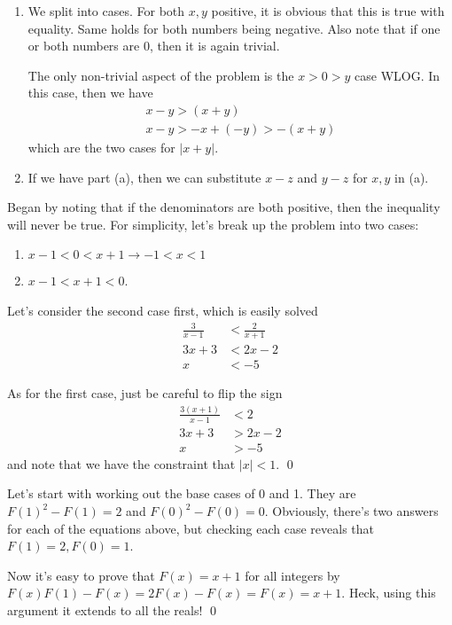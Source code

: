 \setcounter{Exercise}{3}
\begin{Exercise}
	\begin{enumerate}[a]
		\item We split into cases. For both $x, y$ positive, it is obvious that this is true with equality.
		Same holds for both numbers being negative. 
		Also note that if one or both numbers are 0, then it is again trivial. 

		The only non-trivial aspect of the problem is the $x > 0 > y$ case WLOG.
		In this case, then we have
		\begin{align*}
			x - y > (x + y) \\
			x - y > -x + (-y) > -(x+y)
		\end{align*}
		which are the two cases for $|x + y|$.

		\item If we have part (a), then we can substitute $x-z$ and $y-z$ for $x, y$ in (a).
	\end{enumerate}
\end{Exercise}

\begin{Exercise}
	Began by noting that if the denominators are both positive, then the inequality will never be true. 
	For simplicity, let's break up the problem into two cases:
	\begin{enumerate}
		\item $x-1 < 0 < x+1 \rightarrow -1 < x < 1$
		\item $x-1 < x + 1 < 0$.
	\end{enumerate}

	Let's consider the second case first, which is easily solved
	\begin{align*}
		\frac{3}{x-1} &< \frac{2}{x+1} \\
		3x + 3 &< 2x - 2 \\
		x &< -5
	\end{align*}

	As for the first case, just be careful to flip the sign
	\begin{align*}
		\frac{3(x+1)}{x-1} &< 2 \\
		3x + 3 &> 2x - 2 \\
		x &> -5
	\end{align*}
	and note that we have the constraint that $|x| < 1$. \qed
\end{Exercise}

\begin{Exercise}
\end{Exercise}
\begin{Exercise}
\end{Exercise}

\begin{Exercise}
	Let's start with working out the base cases of 0 and 1.
	They are $F(1)^2 - F(1) = 2$ and $F(0)^2 - F(0) = 0$.
	Obviously, there's two answers for each of the equations above, but checking each case reveals that $F(1) = 2, F(0) = 1$.

	Now it's easy to prove that $F(x)=x+1$ for all integers by $F(x)F(1) - F(x) = 2F(x) - F(x) = F(x) = x + 1$.
	Heck, using this argument it extends to all the reals! \qed
\end{Exercise}